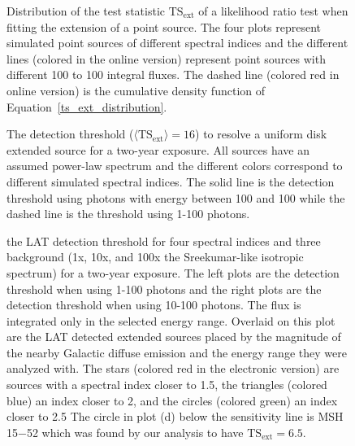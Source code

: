 \documentclass[12pt,preprint]{aastex}
\newif\ifcolorfigure
\newcommand{\mev}{\text{MeV}\xspace}
\newcommand{\gev}{\text{GeV}\xspace}
\newcommand{\tsext}{{\ensuremath{\text{TS}_{\text{ext}}}}\xspace}
\begin{document}
\clearpage
\begin{figure}
    \ifcolorfigure
    \plotone{mc_plots/ts_ext_emin_1000_color.eps}
    \else
    \fi
    \caption{
    Distribution of the test statistic \tsext of a likelihood ratio
    test when fitting the extension of a point source.  The four plots
    represent simulated point sources of different spectral indices and
    the different lines (colored in the online version) 
    represent point sources with different 100 \mev
    to 100 \gev integral fluxes.  The dashed line (colored red in online version)
    is the cumulative
    density function of Equation~\ref{ts_ext_distribution}.
    }\label{ts_ext_mc}
  \end{figure}

\clearpage

\begin{figure}
    \ifcolorfigure
    \plotone{mc_plots/index_sensitivity_color.eps}
    \else
    \fi
    \caption{
    The detection threshold ($\langle\tsext\rangle=16$) to resolve a
    uniform disk extended source for a two-year exposure.  All sources
    have an assumed power-law spectrum and the different colors correspond
    to different simulated spectral indices.  The solid line is the
    detection threshold using photons with energy between 100 \mev and 100
    \gev while the dashed line is the threshold using 1-100 \gev photons.
    }\label{index_sensitivity}
  \end{figure}

\clearpage
\begin{figure}
    \ifcolorfigure
    \plotone{mc_plots/all_sensitivity_color.eps}
    \else
    \fi
    \caption{the LAT detection threshold for four spectral indices and
    three background (1x, 10x, and 100x the Sreekumar-like isotropic
    spectrum) for a two-year exposure. The left plots are the detection
    threshold when using 1-100 \gev photons and the right plots are
    the detection threshold when using 10-100 \gev photons.  The flux
    is integrated only in the selected energy range.  Overlaid on this
    plot are the LAT detected extended sources placed by the magnitude of
    the nearby Galactic diffuse emission and the energy range they were
    analyzed with.  The stars (colored red in the electronic version) are
    sources with a spectral index closer to 1.5, the triangles (colored
    blue) an index closer to 2, and the circles (colored green) an index
    closer to 2.5 The circle in plot (d) below the sensitivity line is
    MSH\,15$-$52 which was found by our analysis to have $\tsext=6.5$.
    }\label{all_sensitivity} 
  \end{figure}
\end{document}
